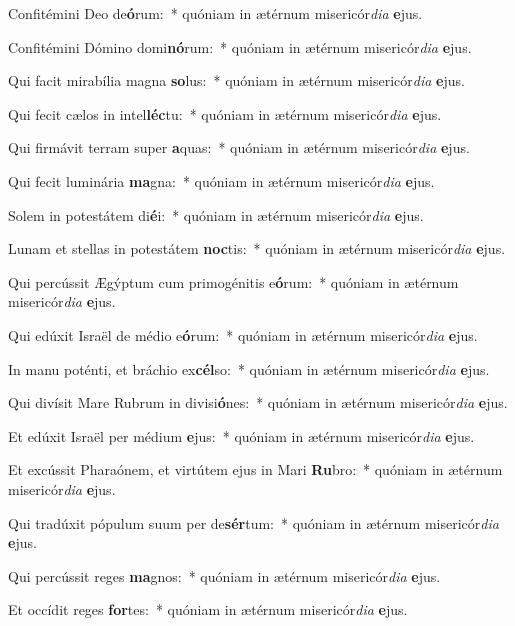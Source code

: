 \item Confitémini Deo de\textbf{ó}rum:~* quóniam in ætérnum misericór\textit{di}\textit{a} \textbf{e}jus.
\item Confitémini Dómino domi\textbf{nó}rum:~* quóniam in ætérnum misericór\textit{di}\textit{a} \textbf{e}jus.
\item Qui facit mirabília magna \textbf{so}lus:~* quóniam in ætérnum misericór\textit{di}\textit{a} \textbf{e}jus.
\item Qui fecit cælos in intel\textbf{léc}tu:~* quóniam in ætérnum misericór\textit{di}\textit{a} \textbf{e}jus.
\item Qui firmávit terram super \textbf{a}quas:~* quóniam in ætérnum misericór\textit{di}\textit{a} \textbf{e}jus.
\item Qui fecit luminária \textbf{ma}gna:~* quóniam in ætérnum misericór\textit{di}\textit{a} \textbf{e}jus.
\item Solem in potestátem di\textbf{é}i:~* quóniam in ætérnum misericór\textit{di}\textit{a} \textbf{e}jus.
\item Lunam et stellas in potestátem \textbf{noc}tis:~* quóniam in ætérnum misericór\textit{di}\textit{a} \textbf{e}jus.
\item Qui percússit Ægýptum cum primogénitis e\textbf{ó}rum:~* quóniam in ætérnum misericór\textit{di}\textit{a} \textbf{e}jus.
\item Qui edúxit Israël de médio e\textbf{ó}rum:~* quóniam in ætérnum misericór\textit{di}\textit{a} \textbf{e}jus.
\item In manu poténti, et bráchio ex\textbf{cél}so:~* quóniam in ætérnum misericór\textit{di}\textit{a} \textbf{e}jus.
\item Qui divísit Mare Rubrum in divisi\textbf{ó}nes:~* quóniam in ætérnum misericór\textit{di}\textit{a} \textbf{e}jus.
\item Et edúxit Israël per médium \textbf{e}jus:~* quóniam in ætérnum misericór\textit{di}\textit{a} \textbf{e}jus.
\item Et excússit Pharaónem, et virtútem ejus in Mari \textbf{Ru}bro:~* quóniam in ætérnum misericór\textit{di}\textit{a} \textbf{e}jus.
\item Qui tradúxit pópulum suum per de\textbf{sér}tum:~* quóniam in ætérnum misericór\textit{di}\textit{a} \textbf{e}jus.
\item Qui percússit reges \textbf{ma}gnos:~* quóniam in ætérnum misericór\textit{di}\textit{a} \textbf{e}jus.
\item Et occídit reges \textbf{for}tes:~* quóniam in ætérnum misericór\textit{di}\textit{a} \textbf{e}jus.
